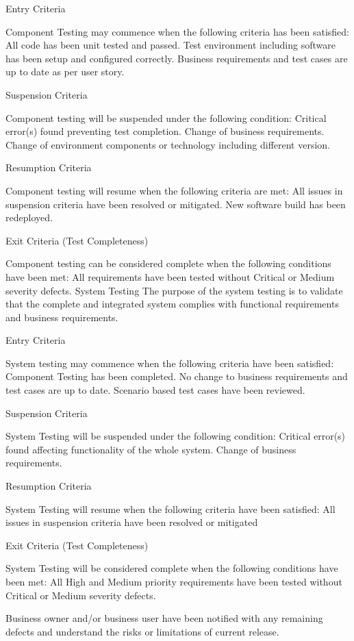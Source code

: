\documentclass[a4paper]{article}
\begin{document}
Entry Criteria

Component Testing may commence when the following criteria has been satisfied:
All code has been unit tested and passed.
Test environment including software has been setup and configured correctly.
Business requirements and test cases are up to date as per user story.

Suspension Criteria

Component testing will be suspended under the following condition:
Critical error(s) found preventing test completion.
Change of business requirements.
Change of environment components or technology including different version.

Resumption Criteria

Component testing will resume when the following criteria are met:
All issues in suspension criteria have been resolved or mitigated.
New software build has been redeployed.

Exit Criteria (Test Completeness)

Component testing can be considered complete when the following conditions have been met:
All requirements have been tested without Critical or Medium severity defects.
 System Testing
The purpose of the system testing is to validate that the complete and integrated system complies with functional requirements and business requirements.

Entry Criteria

System testing may commence when the following criteria have been satisfied:
Component Testing has been completed.
No change to business requirements and test cases are up to date.
Scenario based test cases have been reviewed.

Suspension Criteria

System Testing will be suspended under the following condition:
Critical error(s) found affecting functionality of the whole system.
Change of business requirements.

Resumption Criteria

System Testing will resume when the following criteria have been satisfied:
All issues in suspension criteria have been resolved or mitigated

Exit Criteria (Test Completeness)

System Testing will be considered complete when the following conditions have been met:
All High and Medium priority requirements have been tested without Critical or Medium severity defects.

Business owner and/or business user have been notified with any remaining defects and understand the risks or limitations of current release.
\end{document}
